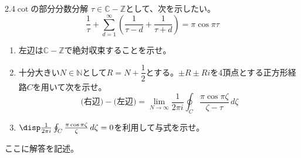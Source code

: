 \begin{thm}{2.4}{}{$\cot$の部分分数分解}
 $\tau\in\mathbb{C}-\mathbb{Z}$として、次を示したい。
 \[ \frac{1}{\tau}+\sum_{d=1}^\infty\left(\frac{1}{\tau-d}+\frac{1}{\tau+d}\right)=\pi\cos\pi\tau \]
 \begin{enumerate}
  \item 左辺は$\mathbb{C}-\mathbb{Z}$で絶対収束することを示せ。
  \item 十分大きい$N\in\mathbb{N}$として$R=N+\dfrac{1}{2}$とする。$\pm R\pm Ri$を4頂点とする正方形経路$C$を用いて次を示せ。
	\[ \text{(右辺)}-\text{(左辺)}=\lim_{N\to\infty}\frac{1}{2\pi i}\oint_C\!\frac{\pi\cos\pi\zeta}{\zeta-\tau} \,d\zeta \]
  \item $\disp \frac{1}{2\pi i}\oint_C \frac{\pi\cos\pi\zeta}{\zeta} \,d\zeta=0$を利用して与式を示せ。
 \end{enumerate}
\end{thm}

ここに解答を記述。

